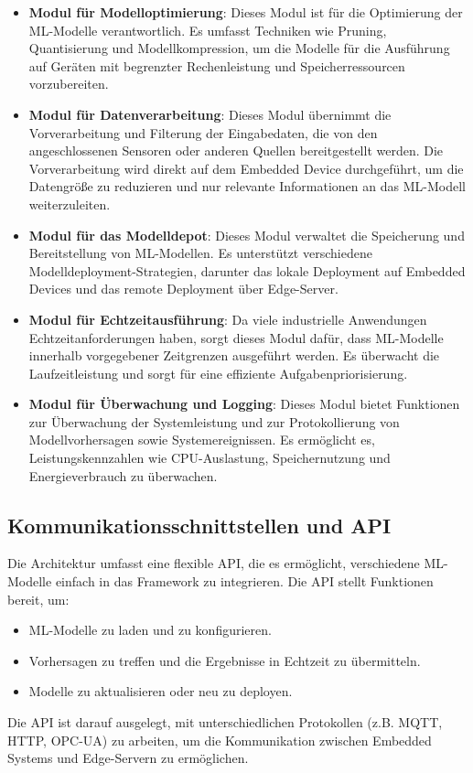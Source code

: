 \begin{itemize}
    \item \textbf{Modul für Modelloptimierung}: Dieses Modul ist für die Optimierung der ML-Modelle verantwortlich. Es umfasst Techniken wie Pruning, 
    Quantisierung und Modellkompression, um die Modelle für die Ausführung auf Geräten mit begrenzter Rechenleistung und Speicherressourcen vorzubereiten.
    
    \item \textbf{Modul für Datenverarbeitung}: Dieses Modul übernimmt die Vorverarbeitung und Filterung der Eingabedaten, die von den angeschlossenen Sensoren 
    oder anderen Quellen bereitgestellt werden. Die Vorverarbeitung wird direkt auf dem Embedded Device durchgeführt, um die Datengröße zu reduzieren und nur 
    relevante Informationen an das ML-Modell weiterzuleiten.
    
    \item \textbf{Modul für das Modelldepot}: Dieses Modul verwaltet die Speicherung und Bereitstellung von ML-Modellen. Es unterstützt verschiedene 
    Modelldeployment-Strategien, darunter das lokale Deployment auf Embedded Devices und das remote Deployment über Edge-Server.
    
    \item \textbf{Modul für Echtzeitausführung}: Da viele industrielle Anwendungen Echtzeitanforderungen haben, sorgt dieses Modul dafür, dass ML-Modelle 
    innerhalb vorgegebener Zeitgrenzen ausgeführt werden. Es überwacht die Laufzeitleistung und sorgt für eine effiziente Aufgabenpriorisierung.
    
    \item \textbf{Modul für Überwachung und Logging}: Dieses Modul bietet Funktionen zur Überwachung der Systemleistung und zur Protokollierung von Modellvorhersagen 
    sowie Systemereignissen. Es ermöglicht es, Leistungskennzahlen wie CPU-Auslastung, Speichernutzung und Energieverbrauch zu überwachen.
\end{itemize}

\subsection{Kommunikationsschnittstellen und API}
Die Architektur umfasst eine flexible API, die es ermöglicht, verschiedene ML-Modelle einfach in das Framework zu integrieren. Die API stellt Funktionen bereit, um:
\begin{itemize}
    \item ML-Modelle zu laden und zu konfigurieren.
    \item Vorhersagen zu treffen und die Ergebnisse in Echtzeit zu übermitteln.
    \item Modelle zu aktualisieren oder neu zu deployen.
\end{itemize}
Die API ist darauf ausgelegt, mit unterschiedlichen Protokollen (z.B. MQTT, HTTP, OPC-UA) zu arbeiten, um die Kommunikation zwischen Embedded Systems und Edge-Servern 
zu ermöglichen.

